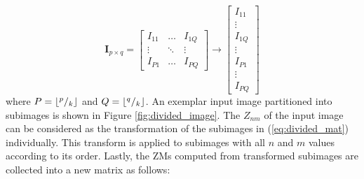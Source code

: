 \documentclass[]{spie}  %
\DeclarePairedDelimiter\floor{\lfloor}{\rfloor}
\begin{document}
\begin{equation}
\mathbf{I}_{p\times q} = \begin{bmatrix}
 I_{11} & \hdots & I_{1Q} \\
 \vdots & \ddots & \vdots \\
 I_{P1} & \hdots & I_{PQ} 
 \end{bmatrix}
 \longrightarrow
 \begin{bmatrix}
 I_{11} \\
 \vdots \\
 I_{1Q} \\
 \vdots \\
 I_{P1} \\
 \vdots \\
 I_{PQ}
 \end{bmatrix}
 \label{eq:divided_mat}
\end{equation}
where $P=\floor*{^p/_k}$ and $Q=\floor*{^q/_k}$. An exemplar input image partitioned into subimages is shown in Figure \ref{fig:divided_image}. The $Z_{nm}$ of the input image can be considered as the transformation of the subimages in (\ref{eq:divided_mat}) individually. This transform is applied to subimages with all $n$ and $m$ values according to its order. Lastly, the ZMs computed from transformed subimages are collected into a new matrix as follows:
\end{document}

